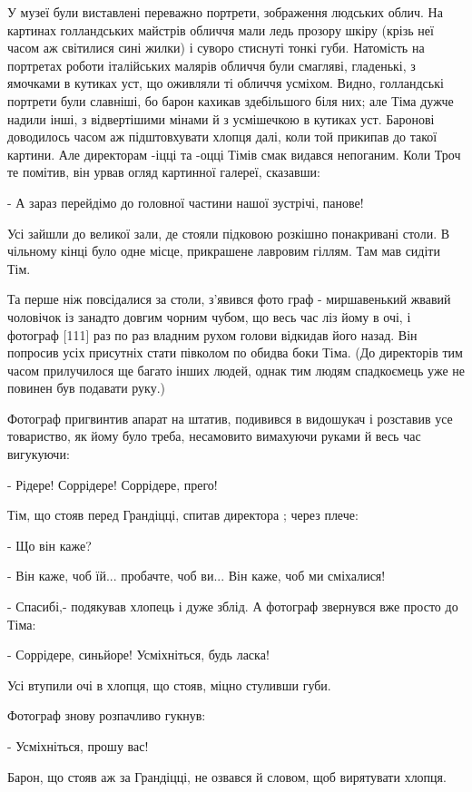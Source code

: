 У музеї були виставлені переважно портрети, зображення людських облич. На картинах голландських майстрів обличчя мали ледь прозору шкіру (крізь неї часом аж світилися сині жилки) і суворо стиснуті тонкі губи. Натомість на портретах роботи італійських малярів обличчя були смагляві, гладенькі, з ямочками в кутиках уст, що оживляли ті обличчя усміхом. Видно, голландські портрети були славніші, бо барон кахикав здебільшого біля них; але Тіма дужче надили інші, з відвертішими мінами й з усмішечкою в кутиках уст. Баронові доводилось часом аж підштовхувати хлопця далі, коли той прикипав до такої картини. Але директорам -іцці та -оцці Тімів смак видався непоганим. Коли Троч те помітив, він урвав огляд картинної галереї, сказавши:

- А зараз перейдімо до головної частини нашої зустрічі, панове!

Усі зайшли до великої зали, де стояли підковою розкішно понакривані столи. В чільному кінці було одне місце, прикрашене лавровим гіллям. Там мав сидіти Тім.

Та перше ніж повсідалися за столи, з'явився фото граф - миршавенький жвавий чоловічок із занадто довгим чорним чубом, що весь час ліз йому в очі, і фотограф [111] раз по раз владним рухом голови відкидав його назад. Він попросив усіх присутніх стати півколом по обидва боки Тіма. (До директорів тим часом прилучилося ще багато інших людей, однак тим людям спадкоємець уже не повинен був подавати руку.)

Фотограф пригвинтив апарат на штатив, подивився в видошукач і розставив усе товариство, як йому було треба, несамовито вимахуючи руками й весь час вигукуючи:

- Рідере! Соррідере! Соррідере, прего!

Тім, що стояв перед Грандіцці, спитав директора ; через плече:

- Що він каже?

- Він каже, чоб їй... пробачте, чоб ви... Він каже, чоб ми сміхалися!

- Спасибі,- подякував хлопець і дуже зблід. А фотограф звернувся вже просто до Тіма:

- Соррідере, синьйоре! Усміхніться, будь ласка!

Усі втупили очі в хлопця, що стояв, міцно стуливши губи.

Фотограф знову розпачливо гукнув:

- Усміхніться, прошу вас!

Барон, що стояв аж за Грандіцці, не озвався й словом, щоб вирятувати хлопця.

